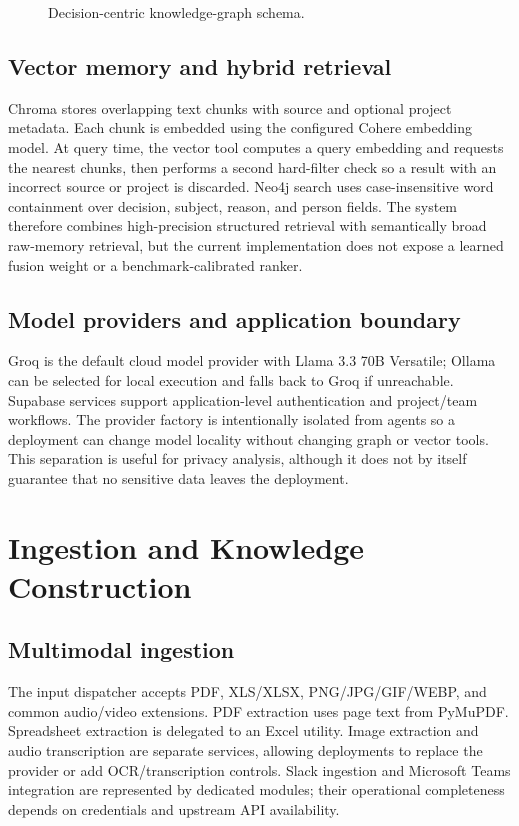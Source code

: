 \documentclass[conference]{IEEEtran}
\begin{document}
\begin{figure}[t]
\centering
\resizebox{\columnwidth}{!}{}
\caption{Decision-centric knowledge-graph schema.}
\label{fig:schema}
\end{figure}

\subsection{Vector memory and hybrid retrieval}
Chroma stores overlapping text chunks with source and optional project metadata. Each chunk is embedded using the configured Cohere embedding model. At query time, the vector tool computes a query embedding and requests the nearest chunks, then performs a second hard-filter check so a result with an incorrect source or project is discarded. Neo4j search uses case-insensitive word containment over decision, subject, reason, and person fields. The system therefore combines high-precision structured retrieval with semantically broad raw-memory retrieval, but the current implementation does not expose a learned fusion weight or a benchmark-calibrated ranker.

\subsection{Model providers and application boundary}
Groq is the default cloud model provider with Llama 3.3 70B Versatile; Ollama can be selected for local execution and falls back to Groq if unreachable. Supabase services support application-level authentication and project/team workflows. The provider factory is intentionally isolated from agents so a deployment can change model locality without changing graph or vector tools. This separation is useful for privacy analysis, although it does not by itself guarantee that no sensitive data leaves the deployment.

\section{Ingestion and Knowledge Construction}
\subsection{Multimodal ingestion}
The input dispatcher accepts PDF, XLS/XLSX, PNG/JPG/GIF/WEBP, and common audio/video extensions. PDF extraction uses page text from PyMuPDF. Spreadsheet extraction is delegated to an Excel utility. Image extraction and audio transcription are separate services, allowing deployments to replace the provider or add OCR/transcription controls. Slack ingestion and Microsoft Teams integration are represented by dedicated modules; their operational completeness depends on credentials and upstream API availability.
\end{document}
